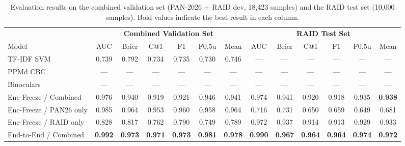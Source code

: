 \documentclass[]{ceurart}
\begin{document}
\begin{table}[t]
  \caption{Evaluation results on the combined validation set (PAN-2026 + RAID dev, 18,423 samples) and the RAID test set (10,000 samples). Bold values indicate the best result in each column.}
  \label{tab:results}
  \begin{tabular}{lcccccc|cccccc}
    \toprule
    & \multicolumn{6}{c|}{\textbf{Combined Validation Set}} & \multicolumn{6}{c}{\textbf{RAID Test Set}} \\
    \cmidrule(lr){2-7}\cmidrule(lr){8-13}
    Model & AUC & Brier & C@1 & F1 & F0.5u & Mean & AUC & Brier & C@1 & F1 & F0.5u & Mean \\
    \midrule
    TF-IDF SVM & 0.739 & 0.792 & 0.734 & 0.735 & 0.730 & 0.746 & --- & --- & --- & --- & --- & --- \\
    PPMd CBC   & --- & --- & --- & --- & --- & --- & --- & --- & --- & --- & --- & --- \\
    Binoculars & --- & --- & --- & --- & --- & --- & --- & --- & --- & --- & --- & --- \\
    \midrule
    Enc-Freeze / Combined & 0.976 & 0.940 & 0.919 & 0.921 & 0.946 & 0.941 & 0.974 & 0.941 & 0.920 & 0.918 & 0.935 & \textbf{0.938} \\
    Enc-Freeze / PAN26 only & 0.985 & 0.964 & 0.953 & 0.960 & 0.958 & 0.964 & 0.716 & 0.731 & 0.650 & 0.659 & 0.649 & 0.681 \\
    Enc-Freeze / RAID only  & 0.828 & 0.817 & 0.762 & 0.790 & 0.749 & 0.789 & 0.972 & 0.937 & 0.914 & 0.913 & 0.929 & 0.933 \\
    End-to-End / Combined   & \textbf{0.992} & \textbf{0.973} & \textbf{0.971} & \textbf{0.973} & \textbf{0.981} & \textbf{0.978} & \textbf{0.990} & \textbf{0.967} & \textbf{0.964} & \textbf{0.964} & \textbf{0.974} & \textbf{0.972} \\
    \bottomrule
  \end{tabular}
\end{table}
\end{document}
